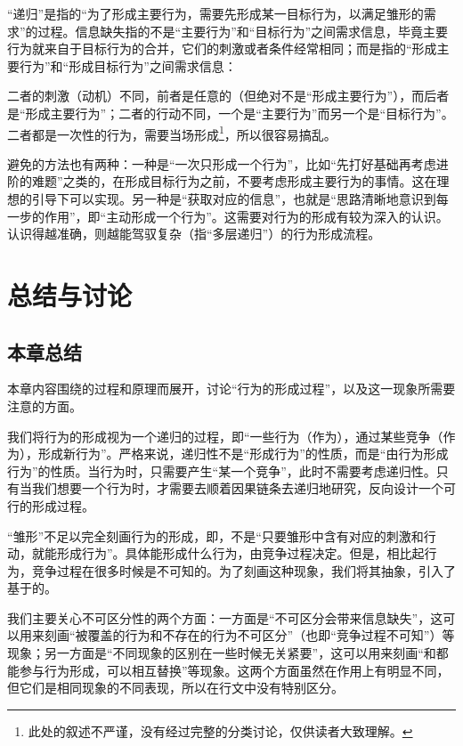 \begin{explain}
“递归”是指的“为了形成主要行为，需要先形成某一目标行为，以满足雏形的需求”的过程。信息缺失指的不是“主要行为”和“目标行为”之间需求信息，毕竟主要行为就来自于目标行为的合并，它们的刺激或者条件经常相同；而是指的“形成主要行为”和“形成目标行为”之间需求信息：

二者的刺激（动机）不同，前者是任意的（但绝对不是“形成主要行为”），而后者是“形成主要行为”；二者的行动不同，一个是“主要行为”而另一个是“目标行为”。二者都是一次性的行为，需要当场形成\footnote{此处的叙述不严谨，没有经过完整的分类讨论，仅供读者大致理解。}，所以很容易搞乱。

避免的方法也有两种：一种是“一次只形成一个行为”，比如“先打好基础再考虑进阶的难题”之类的，在形成目标行为之前，不要考虑形成主要行为的事情。这在理想的引导下可以实现。另一种是“获取对应的信息”，也就是“思路清晰地意识到每一步的作用”，即“主动形成一个行为”。这需要对行为的形成有较为深入的认识。认识得越准确，则越能驾驭复杂（指“多层递归”）的行为形成流程。
\end{explain}

\section{总结与讨论}
\subsection{本章总结}
本章内容围绕的过程和原理而展开，讨论“行为的形成过程”，以及这一现象所需要注意的方面。

我们将行为的形成视为一个递归的过程，即“一些行为（作为），通过某些竞争（作为），形成新行为”。严格来说，递归性不是“形成行为”的性质，而是“由行为形成行为”的性质。当行为时，只需要产生“某一个竞争”，此时不需要考虑递归性。只有当我们想要一个行为时，才需要去顺着因果链条去递归地研究，反向设计一个可行的形成过程。

“雏形”不足以完全刻画行为的形成，即，不是“只要雏形中含有对应的刺激和行动，就能形成行为”。具体能形成什么行为，由竞争过程决定。但是，相比起行为，竞争过程在很多时候是不可知的。为了刻画这种现象，我们将其抽象，引入了基于的。

我们主要关心不可区分性的两个方面：一方面是“不可区分会带来信息缺失”，这可以用来刻画“被覆盖的行为和不存在的行为不可区分”（也即“竞争过程不可知”）等现象；另一方面是“不同现象的区别在一些时候无关紧要”，这可以用来刻画“和都能参与行为形成，可以相互替换”等现象。这两个方面虽然在作用上有明显不同，但它们是相同现象的不同表现，所以在行文中没有特别区分。

